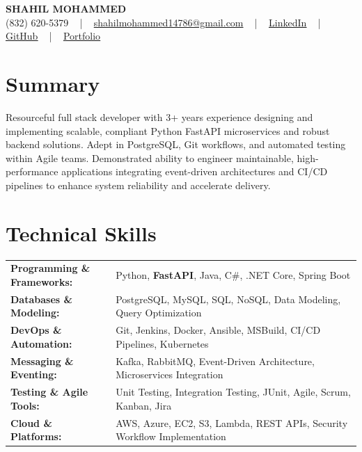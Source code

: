 \documentclass[letterpaper,11pt]{article}
\begin{document}
\begin{center}
    {\fontsize{14pt}{12pt}\selectfont \textbf{\MakeUppercase{Shahil Mohammed}}}\\ \vspace{2pt}
    \fontsize{10pt}{12pt}\selectfont (832) 620-5379 ~ | ~ \href{mailto:shahilmohammed14786@gmail.com}{shahilmohammed14786@gmail.com} ~ | ~  
    \href{https://www.linkedin.com/in/shahil-mohammed-9652931a1/}{\color{blue}\underline{LinkedIn}}  ~ | ~ 
    \href{https://github.com/freakbeast14}{\color{blue}\underline{GitHub}} ~ | ~ 
    \href{https://shahil-mohammed.netlify.app/}{\color{blue}\underline{Portfolio}}
    \vspace{-8pt}
\end{center}

\section{Summary}
\fontsize{9pt}{10pt}\selectfont
Resourceful full stack developer with 3+ years experience designing and implementing scalable, compliant Python FastAPI microservices and robust backend solutions. Adept in PostgreSQL, Git workflows, and automated testing within Agile teams. Demonstrated ability to engineer maintainable, high-performance applications integrating event-driven architectures and CI/CD pipelines to enhance system reliability and accelerate delivery.
 \vspace{-5pt}
 
\section{Technical Skills}
        \vspace{-14pt}
        \begin{table}[h]
            \fontsize{9pt}{10pt}\selectfont
            \begin{tabular}{p{0.3\linewidth} p{0.7\linewidth}}
                \textbf{Programming \& Frameworks:} & Python, \textbf{FastAPI}, Java, C\#, .NET Core, Spring Boot \\
                \textbf{Databases \& Modeling:} & PostgreSQL, MySQL, SQL, NoSQL, Data Modeling, Query Optimization \\
                \textbf{DevOps \& Automation:} & Git, Jenkins, Docker, Ansible, MSBuild, CI/CD Pipelines, Kubernetes \\
                \textbf{Messaging \& Eventing:} & Kafka, RabbitMQ, Event-Driven Architecture, Microservices Integration \\
                \textbf{Testing \& Agile Tools:} & Unit Testing, Integration Testing, JUnit, Agile, Scrum, Kanban, Jira \\
                \textbf{Cloud \& Platforms:} & AWS, Azure, EC2, S3, Lambda, REST APIs, Security Workflow Implementation \\
            \end{tabular}
        \end{table}
 \vspace{-15pt}
 
\end{document}
